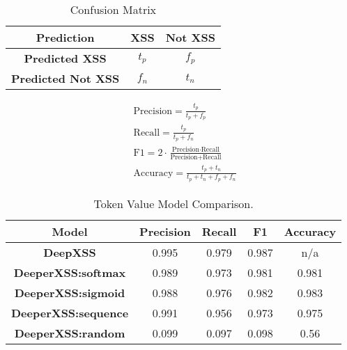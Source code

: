 \begin{table}
\begin{center}
\begingroup
\setlength{\tabcolsep}{10pt} %
\renewcommand{\arraystretch}{1.5} %
\begin{tabular}{|| c | c | c ||} 
    \hline
    Prediction & XSS & Not XSS \\ 
    \hline\hline
    \textbf{Predicted XSS} &  $t_p$ & $f_p$ \\ 
    \hline
    \textbf{Predicted Not XSS} & $f_n$ & $t_n$ \\
    \hline
\end{tabular}
\endgroup
\caption{\label{conf-mat}Confusion Matrix}
\end{center}
\end{table}


\begin{align*}
    &\text{Precision} = \frac{t_p}{t_p + f_p} \\[10pt]
    &\text{Recall} = \frac{t_p}{t_p + f_n} \\[10pt]
    &\text{F1} = 2 \cdot \frac{\text{Precision} \cdot \text{Recall}}{\text{Precision} + \text{Recall}}\\[10pt]
    &\text{Accuracy} = \frac{t_p + t_n}{t_p + t_n + f_p + f_n}
\end{align*}

\begin{table}
\begin{center}
\begingroup
\setlength{\tabcolsep}{4pt} %
\renewcommand{\arraystretch}{1.5} %
\begin{tabular}{|| c | c | c | c | c ||} 
    \hline
    Model & Precision & Recall & F1 & Accuracy \\ 
    \hline\hline
    \textbf{DeepXSS} &  0.995 & 0.979 & 0.987 & n/a \\ 
    \hline
    \textbf{DeeperXSS:softmax} & 0.989 & 0.973 & 0.981 & 0.981 \\
    \hline
    \textbf{DeeperXSS:sigmoid} & 0.988 & 0.976 & 0.982 & 0.983 \\
    \hline
    \textbf{DeeperXSS:sequence} & 0.991 & 0.956 & 0.973 & 0.975 \\
    \hline
    \textbf{DeeperXSS:random} & 0.099 & 0.097 & 0.098 & 0.56 \\
    \hline
\end{tabular}
\endgroup
\caption{\label{comparison}Token Value Model Comparison.}
\end{center}
\end{table}

